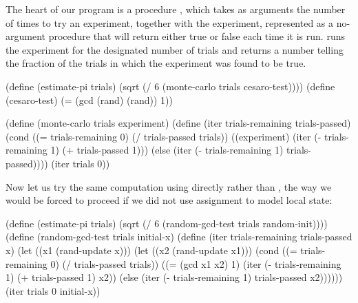 The heart of our program is a procedure , which takes as
arguments the number of times to try an experiment, together with the
experiment, represented as a no-argument procedure that will return either true
or false each time it is run.   runs the experiment for the
designated number of trials and returns a number telling the fraction of the
trials in which the experiment was found to be true.

\begin{codeBlock}
(define (estimate-pi trials)
  (sqrt (/ 6 (monte-carlo trials cesaro-test))))
(define (cesaro-test)
   (= (gcd (rand) (rand)) 1))

(define (monte-carlo trials experiment)
  (define (iter trials-remaining trials-passed)
    (cond ((= trials-remaining 0)
           (/ trials-passed trials))
          ((experiment)
           (iter (- trials-remaining 1)
                 (+ trials-passed 1)))
          (else
           (iter (- trials-remaining 1)
                 trials-passed))))
  (iter trials 0))
\end{codeBlock}

\noindent
Now let us try the same computation using  directly rather
than , the way we would be forced to proceed if we did not use
assignment to model local state:

\begin{codeBlock}
(define (estimate-pi trials)
  (sqrt (/ 6 (random-gcd-test trials random-init))))
(define (random-gcd-test trials initial-x)
  (define (iter trials-remaining trials-passed x)
    (let ((x1 (rand-update x)))
      (let ((x2 (rand-update x1)))
        (cond ((= trials-remaining 0)
               (/ trials-passed trials))
              ((= (gcd x1 x2) 1)
               (iter (- trials-remaining 1)
                     (+ trials-passed 1)
                     x2))
              (else
               (iter (- trials-remaining 1)
                     trials-passed
                     x2))))))
  (iter trials 0 initial-x))
\end{codeBlock}

